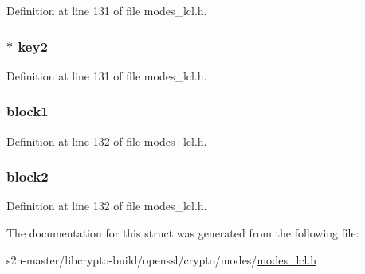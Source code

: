 Definition at line 131 of file modes\+\_\+lcl.\+h.

\subsubsection[{\texorpdfstring{key2}{key2}}]{ $\ast$ key2}\hypertarget{structxts128__context_a27d8c524b81a53179ad1740e3873cd57}{}\label{structxts128__context_a27d8c524b81a53179ad1740e3873cd57}


Definition at line 131 of file modes\+\_\+lcl.\+h.

\subsubsection[{\texorpdfstring{block1}{block1}}]{ block1}\hypertarget{structxts128__context_ac1bc2eb39f76346ab82ed2763ebd42cf}{}\label{structxts128__context_ac1bc2eb39f76346ab82ed2763ebd42cf}


Definition at line 132 of file modes\+\_\+lcl.\+h.

\subsubsection[{\texorpdfstring{block2}{block2}}]{ block2}\hypertarget{structxts128__context_a2099e113f7606ae71c6a69900303a7e1}{}\label{structxts128__context_a2099e113f7606ae71c6a69900303a7e1}


Definition at line 132 of file modes\+\_\+lcl.\+h.



The documentation for this struct was generated from the following file\+:\begin{DoxyCompactItemize}
\item 
s2n-\/master/libcrypto-\/build/openssl/crypto/modes/\hyperlink{modes__lcl_8h}{modes\+\_\+lcl.\+h}\end{DoxyCompactItemize}
